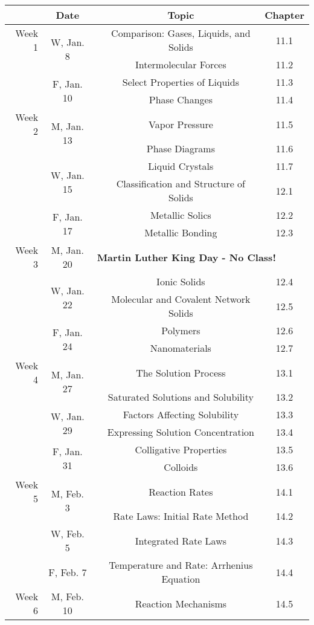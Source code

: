 \begin{tabular}{rcccc}
& Date && Topic & Chapter\\
\midrule
Week 1 & \multirow{2}{*}{W, Jan. 8}& & Comparison: Gases, Liquids, and Solids & 11.1\\
& & & Intermolecular Forces & 11.2\\
& \multirow{2}{*}{F, Jan. 10}& & Select Properties of Liquids & 11.3\\
& & & Phase Changes & 11.4\\
\midrule
Week 2 & \multirow{2}{*}{M, Jan. 13}& & Vapor Pressure & 11.5\\
& & & Phase Diagrams & 11.6\\
& \multirow{2}{*}{W, Jan. 15}& & Liquid Crystals & 11.7\\
& & & Classification and Structure of Solids & 12.1\\
& \multirow{2}{*}{F, Jan. 17}& & Metallic Solics & 12.2\\
& & & Metallic Bonding & 12.3\\
\midrule
Week 3 & M, Jan. 20& \multicolumn{3}{l}{\textbf{Martin Luther King Day - No Class!}}\\
& \multirow{2}{*}{W, Jan. 22}& & Ionic Solids & 12.4\\
& & & Molecular and Covalent Network Solids & 12.5\\
& \multirow{2}{*}{F, Jan. 24}& & Polymers & 12.6\\
& & & Nanomaterials & 12.7\\
\midrule
Week 4 & \multirow{2}{*}{M, Jan. 27}& & The Solution Process & 13.1\\
& & & Saturated Solutions and Solubility & 13.2\\
& \multirow{2}{*}{W, Jan. 29}& & Factors Affecting Solubility & 13.3\\
& & & Expressing Solution Concentration & 13.4\\
& \multirow{2}{*}{F, Jan. 31}& & Colligative Properties & 13.5\\
& & & Colloids & 13.6\\
\midrule
Week 5 & \multirow{2}{*}{M, Feb. 3}& & Reaction Rates & 14.1\\
& & & Rate Laws: Initial Rate Method & 14.2\\
& W, Feb. 5&& Integrated Rate Laws & 14.3\\
& F, Feb. 7&& Temperature and Rate: Arrhenius Equation & 14.4\\
\midrule
Week 6 & \multirow{2}{*}{M, Feb. 10}& & Reaction Mechanisms & 14.5\\

\end{tabular}
